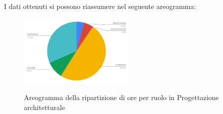 I dati ottenuti si possono riassumere nel seguente areogramma:
\begin{figure}[H] 
			\centering 
				\includegraphics[width=0.5\textwidth]{res/images/areogramma_architetturale.png}\\
				\caption{Areogramma della ripartizione di ore per ruolo in Progettazione architetturale}
			\label{AreogrammaArchitetturale}
\end{figure}

